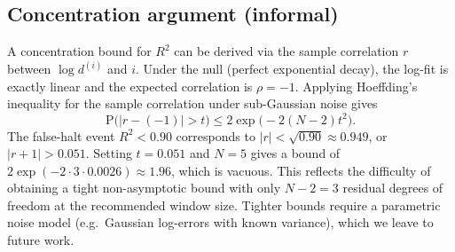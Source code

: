 \documentclass{article}
\begin{document}
\subsection{Concentration argument (informal)}
A concentration bound for $R^2$ can be derived via the sample correlation $r$
between $\log d^{(i)}$ and $i$.  Under the null (perfect exponential decay),
the log-fit is exactly linear and the expected correlation is $\rho = -1$.
Applying Hoeffding's inequality for the sample correlation under sub-Gaussian
noise gives
\[
\mathrm{P}\bigl(|r - (-1)| > t\bigr) \leq 2\exp\bigl(-2(N-2)t^2\bigr).
\]
The false-halt event $R^2 < 0.90$ corresponds to $|r| < \sqrt{0.90} \approx 0.949$,
or $|r+1| > 0.051$.  Setting $t = 0.051$ and $N=5$ gives a bound of
$2\exp(-2 \cdot 3 \cdot 0.0026) \approx 1.96$, which is vacuous.
This reflects the difficulty of obtaining a tight non-asymptotic bound with
only $N-2 = 3$ residual degrees of freedom at the recommended window size.
Tighter bounds require a parametric noise model (e.g.\ Gaussian log-errors
with known variance), which we leave to future work.
\end{document}
